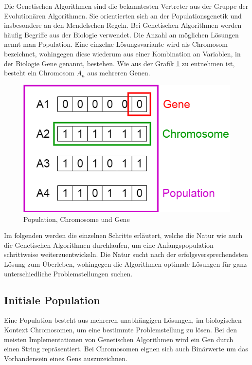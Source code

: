 Die Genetischen Algorithmen sind die bekanntesten Vertreter aus der Gruppe der Evolutionären
Algorithmen. Sie orientierten sich an der Populationsgenetik und insbesondere an den Mendelschen
Regeln. \cite{Mcc00}
Bei Genetischen Algorithmen werden häufig Begriffe aus der Biologie verwendet. Die Anzahl an
möglichen Lösungen nennt man Population. Eine einzelne Lösungsvariante wird als Chromosom
bezeichnet, wohingegen diese wiederum aus einer Kombination an Variablen, in der Biologie Gene
genannt, bestehen. Wie aus der Grafik \ref{fig:genetics} zu entnehmen ist, besteht ein Chromosom
$A_n$ aus mehreren Genen.
\\
\begin{figure}[h!]
  \centering
  \includegraphics[scale=0.5]{resources/genetic_algorithms.png}
  \caption{Population, Chromosome und Gene}
  \label{fig:genetics}
\end{figure}

Im folgenden werden die einzelnen Schritte erläutert, welche die Natur wie auch die Genetischen
Algorithmen durchlaufen, um eine Anfangspopulation schrittweise weiterzuentwickeln. Die Natur
sucht nach der erfolgsversprechendsten Lösung zum Überleben, wohingegen die Algorithmen
optimale Lösungen für ganz unterschiedliche Problemstellungen suchen. \cite{Mal17}

\subsection{Initiale Population}
Eine Population besteht aus mehreren unabhängigen Lösungen, im biologischen Kontext Chromosomen,
um eine bestimmte Problemstellung zu lösen. Bei den meisten Implementationen von Genetischen
Algorithmen wird ein Gen durch einen String repräsentiert. Bei Chromosomen eignen sich auch
Binärwerte um das Vorhandensein eines Gens auszuzeichnen.

